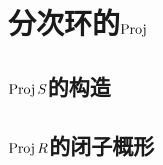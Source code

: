 \section{分次环的\texorpdfstring{$\operatorname{Proj}$}{Proj}}

\subsection{\texorpdfstring{$\operatorname{Proj} S$}{Proj S}的构造}

\subsection{\texorpdfstring{$\operatorname{Proj} R$}{Proj R}的闭子概形}
